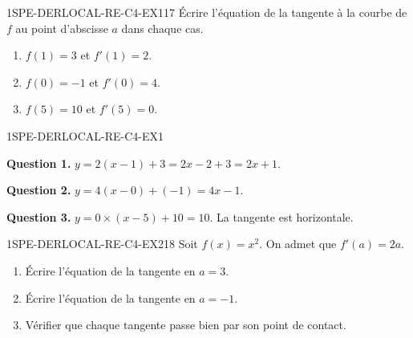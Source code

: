 

\begin{exercice}{1SPE-DERLOCAL-RE-C4-EX1}{1}{7}
Écrire l'équation de la tangente à la courbe de $f$ au point d'abscisse $a$ dans chaque cas.
\begin{enumerate}
  \item $f(1) = 3$ et $f'(1) = 2$.
  \item $f(0) = -1$ et $f'(0) = 4$.
  \item $f(5) = 10$ et $f'(5) = 0$.
\end{enumerate}
\end{exercice}



\begin{corrige}{1SPE-DERLOCAL-RE-C4-EX1}


\textbf{Question 1.}
$y = 2(x-1) + 3 = 2x - 2 + 3 = 2x + 1.$

\textbf{Question 2.}
$y = 4(x-0) + (-1) = 4x - 1.$

\textbf{Question 3.}
$y = 0 \times (x-5) + 10 = 10.$ La tangente est horizontale.

\end{corrige}


\begin{exercice}{1SPE-DERLOCAL-RE-C4-EX2}{1}{8}
Soit $f(x) = x^2$. On admet que $f'(a) = 2a$.
\begin{enumerate}
  \item Écrire l'équation de la tangente en $a = 3$.
  \item Écrire l'équation de la tangente en $a = -1$.
  \item Vérifier que chaque tangente passe bien par son point de contact.
\end{enumerate}
\end{exercice}


